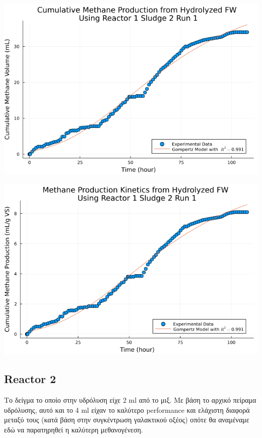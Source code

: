 \documentclass[11pt]{article}
\begin{document}
\begin{center}
\includegraphics[width=.9\linewidth]{../plots/BMPs/Hydrolyzed FW/methane_kinetics_hydrolysate_1_s2_r1_hour.png}
\end{center}

\begin{center}
\includegraphics[width=.9\linewidth]{../plots/BMPs/Hydrolyzed FW/specific_methane_kinetics_hydrolysate_1_s2_r1_hour.png}
\end{center}

\subsection{Reactor 2}
\label{sec:orgd3f50ae}
Το δείγμα το οποίο στην υδρόλυση είχε 2 ml από το μιξ. Με βάση το αρχικό πείραμα υδρόλυσης, αυτό και το 4 ml είχαν το καλύτερο performance και ελάχιστη διαφορά μεταξύ τους (κατά βάση στην συγκέντρωση γαλακτικού οξέος) οπότε θα αναμέναμε εδώ να παρατηρηθεί η καλύτερη μεθανογένεση.
\end{document}
